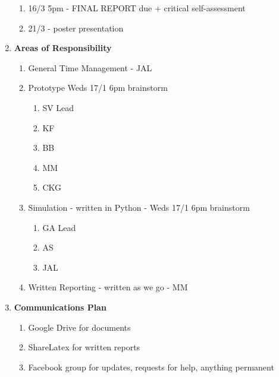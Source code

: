 \begin{enumerate}
\begin{enumerate}
\item  16/3 5pm - FINAL REPORT due + critical self-assessment

\item  21/3 - poster presentation\\
\end{enumerate}

\item  \textbf{Areas of Responsibility}

\begin{enumerate}
\item \textbf{ }General Time Management - JAL

\item  Prototype Weds 17/1 6pm brainstorm

\begin{enumerate}
\item  SV Lead

\item  KF

\item  BB

\item  MM

\item  CKG
\end{enumerate}

\item  Simulation - written in Python - Weds 17/1 6pm brainstorm

\begin{enumerate}
\item  GA Lead

\item  AS

\item  JAL
\end{enumerate}

\item  Written Reporting - written as we go - MM\\
\end{enumerate}

\item  \textbf{Communications Plan}

\begin{enumerate}
\item \textbf{ }Google Drive for documents

\item  ShareLatex for written reports

\item  Facebook group for updates, requests for help, anything permanent


\end{enumerate}
\end{enumerate}

